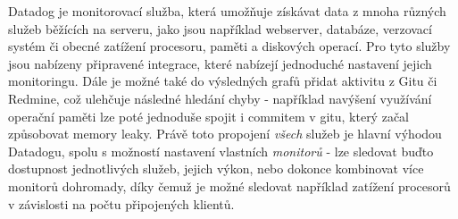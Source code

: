 Datadog \cite{datadog} je monitorovací služba, která umožňuje získávat data z mnoha různých služeb běžících na serveru, jako jsou například webserver, databáze, verzovací systém či obecné zatížení procesoru, paměti a diskových operací. Pro tyto služby jsou nabízeny připravené integrace, které nabízejí jednoduché nastavení jejich monitoringu. Dále je možné také do výsledných grafů přidat aktivitu z Gitu či Redmine, což ulehčuje následné hledání chyby - například navýšení využívání operační paměti lze poté jednoduše spojit i commitem v gitu, který začal způsobovat memory leaky. Právě toto propojení \emph{všech} služeb je hlavní výhodou Datadogu, spolu s možností nastavení vlastních \emph{monitorů} - lze sledovat buďto dostupnost jednotlivých služeb, jejich výkon, nebo dokonce kombinovat více monitorů dohromady, díky čemuž je možné sledovat například zatížení procesorů v závislosti na počtu připojených klientů.

